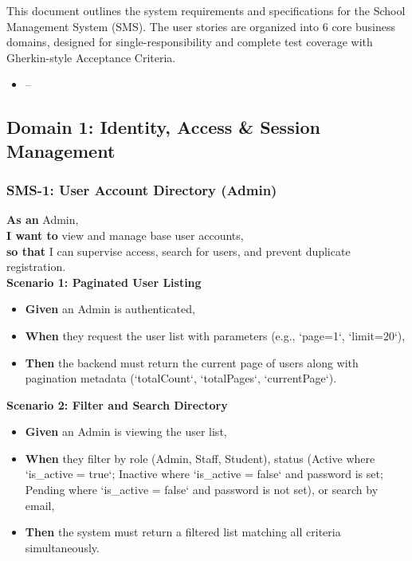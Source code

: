 
This document outlines the system requirements and specifications for the School Management System (SMS). The user stories are organized into 6 core business domains, designed for single-responsibility and complete test coverage with Gherkin-style Acceptance Criteria.

\begin{itemize}
  \item --
\end{itemize}

\subsection{Domain 1: Identity, Access \& Session Management}


\subsubsection{SMS-1: User Account Directory (Admin)}
\noindent \textbf{As an} Admin, \\
\noindent \textbf{I want to} view and manage base user accounts, \\
\noindent \textbf{so that} I can supervise access, search for users, and prevent duplicate registration. \\



\noindent\textbf{Scenario 1: Paginated User Listing}\\
\begin{itemize}
  \item \textbf{Given} an Admin is authenticated,
  \item \textbf{When} they request the user list with parameters (e.g., `page=1`, `limit=20`),
  \item \textbf{Then} the backend must return the current page of users along with pagination metadata (`totalCount`, `totalPages`, `currentPage`).
\end{itemize}


\noindent\textbf{Scenario 2: Filter and Search Directory}\\
\begin{itemize}
  \item \textbf{Given} an Admin is viewing the user list,
  \item \textbf{When} they filter by role (Admin, Staff, Student), status (Active where `is\_active = true`; Inactive where `is\_active = false` and password is set; Pending where `is\_active = false` and password is not set), or search by email,
  \item \textbf{Then} the system must return a filtered list matching all criteria simultaneously.
\end{itemize}


